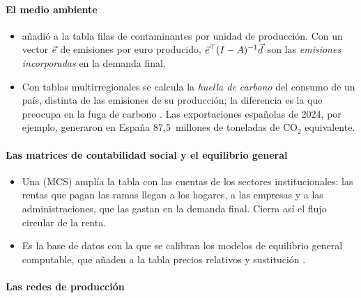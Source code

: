 \documentclass[11pt]{article}
\begin{document}
\paragraph{El medio ambiente}

\begin{itemize}
\item \textcite{Leontief1970} añadió a la tabla filas de contaminantes por unidad de producción. Con un vector $\vec{e}$ de emisiones por euro producido, $\vec{e}^{\top}(I-A)^{-1}\vec{d}$ son las \emph{emisiones incorporadas} en la demanda final.
\item Con tablas multirregionales se calcula la \emph{huella de carbono} del consumo de un país, distinta de las emisiones de su producción; la diferencia es la que preocupa en la fuga de carbono . Las exportaciones españolas de 2024, por ejemplo, generaron en España 87,5~millones de toneladas de CO$_2$ equivalente\nocite{INE2026TiVA2024}.
\end{itemize}

\paragraph{Las matrices de contabilidad social y el equilibrio general}

\begin{itemize}
\item Una  (MCS) amplía la tabla con las cuentas de los sectores institucionales: las rentas que pagan las ramas llegan a los hogares, a las empresas y a las administraciones, que las gastan en la demanda final. Cierra así el flujo circular de la renta\nocite{PyattRound1979}.
\item Es la base de datos con la que se calibran los modelos de equilibrio general computable, que añaden a la tabla precios relativos y sustitución .
\end{itemize}

\paragraph{Las redes de producción}
\end{document}
